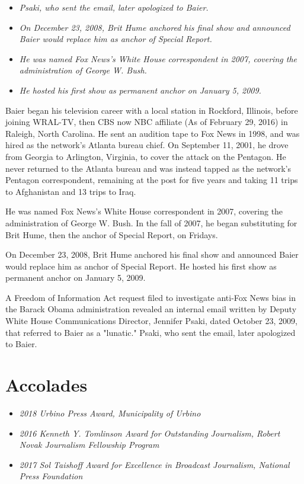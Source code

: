 \begin{itemize}
\item
  \emph{Psaki, who sent the email, later apologized to Baier.}
\item
  \emph{On December 23, 2008, Brit Hume anchored his final show and
  announced Baier would replace him as anchor of Special Report.}
\item
  \emph{He was named Fox News's White House correspondent in 2007,
  covering the administration of George W. Bush.}
\item
  \emph{He hosted his first show as permanent anchor on January 5,
  2009.}
\end{itemize}

Baier began his television career with a local station in Rockford,
Illinois, before joining WRAL-TV, then CBS now NBC affiliate (As of
February 29, 2016) in Raleigh, North Carolina. He sent an audition tape
to Fox News in 1998, and was hired as the network's Atlanta bureau
chief. On September 11, 2001, he drove from Georgia to Arlington,
Virginia, to cover the attack on the Pentagon. He never returned to the
Atlanta bureau and was instead tapped as the network's Pentagon
correspondent, remaining at the post for five years and taking 11 trips
to Afghanistan and 13 trips to Iraq.

He was named Fox News's White House correspondent in 2007, covering the
administration of George W. Bush. In the fall of 2007, he began
substituting for Brit Hume, then the anchor of Special Report, on
Fridays.

On December 23, 2008, Brit Hume anchored his final show and announced
Baier would replace him as anchor of Special Report. He hosted his first
show as permanent anchor on January 5, 2009.

A Freedom of Information Act request filed to investigate anti-Fox News
bias in the Barack Obama administration revealed an internal email
written by Deputy White House Communications Director, Jennifer Psaki,
dated October 23, 2009, that referred to Baier as a "lunatic." Psaki,
who sent the email, later apologized to Baier.

\section{Accolades}\label{accolades}

\begin{itemize}
\item
  \emph{2018 Urbino Press Award, Municipality of Urbino}
\item
  \emph{2016 Kenneth Y. Tomlinson Award for Outstanding Journalism,
  Robert Novak Journalism Fellowship Program}
\item
  \emph{2017 Sol Taishoff Award for Excellence in Broadcast Journalism,
  National Press Foundation}
\end{itemize}

